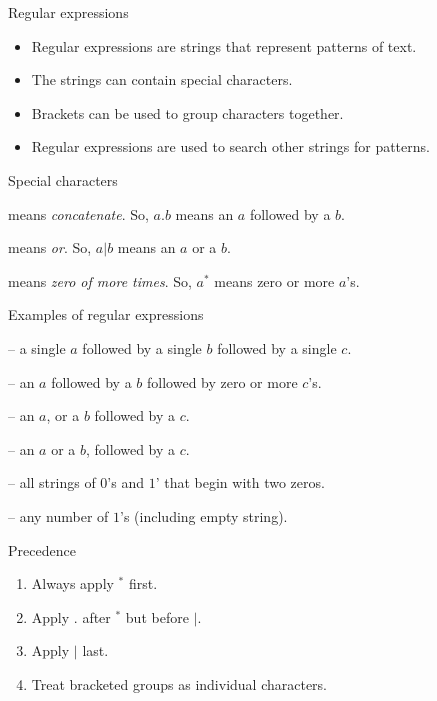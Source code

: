  \begin{frame}{Regular expressions}
  

  \begin{itemize}
    \item Regular expressions are strings that represent patterns of text.
    \item The strings can contain special characters.
    \item Brackets can be used to group characters together.
    \item Regular expressions are used to search other strings for patterns.
  \end{itemize}
  \vspace{2mm}
  \begin{alertblock}{Special characters}
    \begin{description}[abbb]
      \item[$.$] means \emph{concatenate}. So, $a.b$ means an $a$ followed by a $b$.
      \item[$|$] means \emph{or}. So, $a|b$ means an $a$ or a $b$.
      \item[$^*$] means \emph{zero of more times}. So, $a^*$ means zero or more $a$'s.
    \end{description}
  \end{alertblock}
\end{frame}

\begin{frame}{Examples of regular expressions}
  \begin{description}[aaaaaaaa]
    \setlength\itemsep{5mm}
    \item[$a.b.c$] -- a single $a$ followed by a single $b$ followed by a single $c$. 
    \item[$a.b.c^*$] -- an $a$ followed by a $b$ followed by zero or more $c$'s.
    \item[$a|b.c$] -- an $a$, or a $b$ followed by a $c$.
    \item[$(a|b).c$] -- an $a$ or a $b$, followed by a $c$.
    \item[$0.0.(0|1)^*$] -- all strings of $0$'s and $1$' that begin with two zeros.
    \item[$1^*$] -- any number of $1$'s (including empty string).
  \end{description}
\end{frame}

\begin{frame}{Precedence}
  \begin{enumerate}
    \setlength\itemsep{5mm}
    \item Always apply $^*$ first.
    \item Apply $.$ after $^*$ but before $|$.
    \item Apply $|$ last.
    \item Treat bracketed groups as individual characters.
  \end{enumerate}
\end{frame}

